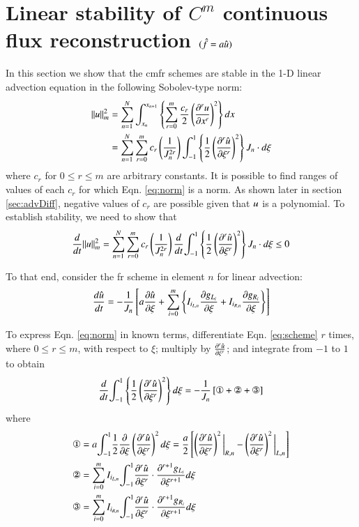 \section{Linear stability of $C^m$ continuous flux reconstruction $({\hat{f}} = a\hat{u})$}

In this section we show that the \gls{cmfr} schemes are stable in the 1-D linear advection equation in the following Sobolev-type norm:
\begin{equation}\label{eq:norm}
\begin{split}
|| u ||^2_m &=\sum_{n=1}^{N}\int_{x_n}^{x_{n+1}} \left\{ \sum^m_{r=0}
\frac{c_r}{2} \left( {\frac{\partial ^r u}{\partial x^r}} \right)^2 \right\} dx \\
&=\sum_{n=1}^{N}   \sum^m_{r=0}
c_r \left(  \frac{1}{J_n^{2r}}\right) {\int^1_{-1}} \left\{ \frac{1}{2}\left({\frac{\partial^{r} {\hat{u}}}{\partial \xi^{r}}} \right)^2
\right\} J_n \cdot d\xi 
\end{split}
\end{equation}
where $c_r$ for $0 \le r \le m$ are arbitrary constants. %
It is possible to find ranges of values of each $c_r$ for which Eqn. \eqref{eq:norm} is a norm. As shown later in section \ref{sec:advDiff}, negative values of $c_r$ are possible given that $u$ is a polynomial. To establish stability, we need to show that
\begin{equation}
\label{eq:ddnorm}
\frac{d }{d t}||u||^2_m = \sum_{n=1}^{N}   \sum^m_{r=0}
c_r \left(  \frac{1}{J_n^{2r}}\right) \frac{d }{d t}{\int^1_{-1}} \left\{ \frac{1}{2}\left({\frac{\partial^{r} {\hat{u}}}{\partial \xi^{r}}} \right)^2
\right\} J_n \cdot d\xi \le 0
\end{equation} 

To that end, consider the \gls{fr} scheme in element $n$ for linear advection:
\begin{equation}
\label{eq:scheme}
\frac{d \hat{u}}{d t} = -\frac{1}{J_n} \left[ a{\frac{\partial \hat{u}}{\partial \xi}} + \sum_{i=0}^m
\left\{ {I_{i_{L,n}}}
{\frac{\partial {g_{L_i}}}{\partial \xi}} + {I_{i_{R,n}}} {\frac{\partial {g_{R_i}}}{\partial \xi}}\right\} \right]
\end{equation}

To express Eqn. \eqref{eq:norm} in known terms, differentiate Eqn.
\eqref{eq:scheme} $r$ times, where $0\le r\le m$, with respect to $\xi$;
multiply by ${\frac{\partial^{r} {\hat{u}}}{\partial \xi^{r}}}$; and integrate from $-1$ to $1$ to obtain
\begin{equation}
\label{eq:normterm1}
 \DD{}{t}\ioo \l\{ \frac{1}{2}\l( \ddxir{\urd}{r} \r)^2  \r\} d\xi = -\frac{1}{J_n}
\l[\text{\ding{172}}+\text{\ding{173}}+\text{\ding{174}} \r]
\end{equation}
where
\begin{align}
\label{eq:exp1}
 \text{\ding{172}}&= a \ioo \frac{1}{2} \ddxi{}\l( \ddxir{\urd}{r}\r)^2 d\xi=\frac{a}{2}\l[ 
\l( \ddxir{\urd}{r}\r)^2\bigg|_{R,n} - \l( \ddxir{\urd}{r}\r)^2\bigg|_{L,n} \r]\\
\label{eq:normterm2}
\text{\ding{173}}&= \sum^m_{i=0} \IL \ioo \ddxir{\urd}{r}\cdot \ddxir{\gL}{r+1} d\xi\\
\text{\ding{174}}&= \sum^m_{i=0} \IR \ioo \ddxir{\urd}{r}\cdot \ddxir{\gR}{r+1} d\xi
\end{align}


